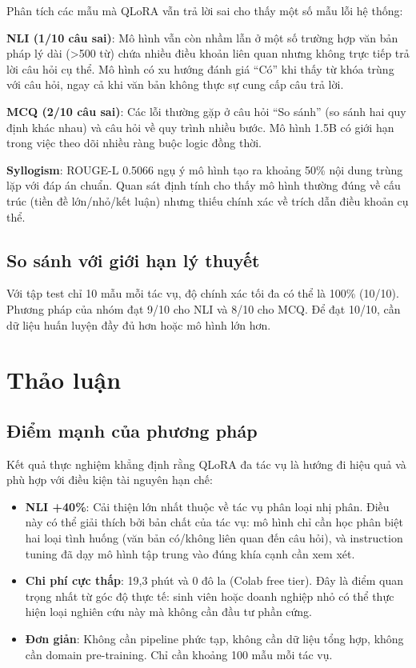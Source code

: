 \documentclass[fontsize=13pt,a4paper,oneside,DIV=calc,chapterprefix=true]{scrbook}
\begin{document}
Phân tích các mẫu mà QLoRA vẫn trả lời sai cho thấy một số mẫu lỗi hệ thống:

\textbf{NLI (1/10 câu sai)}: Mô hình vẫn còn nhầm lẫn ở một số trường hợp văn bản pháp lý
dài (>500 từ) chứa nhiều điều khoản liên quan nhưng không trực tiếp trả lời câu hỏi cụ thể.
Mô hình có xu hướng đánh giá ``Có'' khi thấy từ khóa trùng với câu hỏi, ngay cả khi văn bản
không thực sự cung cấp câu trả lời.

\textbf{MCQ (2/10 câu sai)}: Các lỗi thường gặp ở câu hỏi ``So sánh'' (so sánh hai quy định
khác nhau) và câu hỏi về quy trình nhiều bước. Mô hình 1.5B có giới hạn trong việc theo dõi
nhiều ràng buộc logic đồng thời.

\textbf{Syllogism}: ROUGE-L 0.5066 ngụ ý mô hình tạo ra khoảng 50\% nội dung trùng lặp với
đáp án chuẩn. Quan sát định tính cho thấy mô hình thường đúng về cấu trúc (tiền đề lớn/nhỏ/kết
luận) nhưng thiếu chính xác về trích dẫn điều khoản cụ thể.

\subsection{So sánh với giới hạn lý thuyết}

Với tập test chỉ 10 mẫu mỗi tác vụ, độ chính xác tối đa có thể là 100\% (10/10). Phương pháp
của nhóm đạt 9/10 cho NLI và 8/10 cho MCQ. Để đạt 10/10, cần dữ liệu huấn luyện đầy đủ hơn
hoặc mô hình lớn hơn.

\section{Thảo luận}

\subsection{Điểm mạnh của phương pháp}

Kết quả thực nghiệm khẳng định rằng QLoRA đa tác vụ là hướng đi hiệu quả và phù hợp với
điều kiện tài nguyên hạn chế:

\begin{itemize}
  \item \textbf{NLI +40\%}: Cải thiện lớn nhất thuộc về tác vụ phân loại nhị phân. Điều này
    có thể giải thích bởi bản chất của tác vụ: mô hình chỉ cần học phân biệt hai loại tình
    huống (văn bản có/không liên quan đến câu hỏi), và instruction tuning đã dạy mô hình tập
    trung vào đúng khía cạnh cần xem xét.
  \item \textbf{Chi phí cực thấp}: 19,3 phút và 0 đô la (Colab free tier). Đây là điểm quan
    trọng nhất từ góc độ thực tế: sinh viên hoặc doanh nghiệp nhỏ có thể thực hiện loại nghiên
    cứu này mà không cần đầu tư phần cứng.
  \item \textbf{Đơn giản}: Không cần pipeline phức tạp, không cần dữ liệu tổng hợp, không cần
    domain pre-training. Chỉ cần khoảng 100 mẫu mỗi tác vụ.
\end{itemize}
\end{document}
